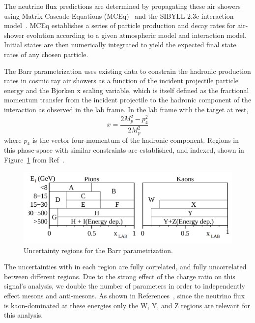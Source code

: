 \documentclass[main.tex]{subfiles}
\begin{document}
The neutrino flux predictions are determined by propagating these air showers using Matrix Cascade Equations (MCEq)~\cite{fedynitch2015calculation} and the SIBYLL 2.3c interaction model~\cite{Riehn:2017mfm}. 
MCEq establishes a series of particle production and decay rates for air-shower evolution according to a given atmospheric model and interaction model. 
Initial states are then numerically integrated to yield the expected final state rates of any chosen particle. 

The Barr parametrization uses existing data to constrain the hadronic production rates in cosmic ray air showers as a function of the incident projectile particle energy and the Bjorken x scaling variable, which is itself defined as the fractional momentum transfer from the incident projectile to the hadronic component of the interaction as observed in the lab frame. 
In the lab frame with the target at rest, 
\begin{equation}
    x = \dfrac{ 2M_{p}^{2} - p_{4}^{2}}{2M_{p}^{2}}
\end{equation}
where $p_{4}$ is the vector four-momentum of the hadronic component. 
Regions in this phase-space with similar constraints are established, and indexed, shown in Figure~\ref{fig:bar_letters} from Ref~\cite{PhysRevD.74.094009}. 
\begin{figure}
    \centering
    \includegraphics[width=0.7\linewidth]{./figures/barr_letters.png}
    \caption{Uncertainty regions for the Barr parametrization.}\label{fig:bar_letters}
\end{figure}
The uncertainties with in each region are fully correlated, and fully uncorrelated between different regions.
Due to the strong effect of the charge ratio on this signal's analysis, we double the number of parameters in order to independently effect mesons and anti-mesons. 
As shown in References~\cite{Aartsen_2020, Aartsen_2020_prd, axani2020sterile}, since the neutrino flux is kaon-dominated at these energies only the W, Y, and Z regions are relevant for this analysis. 
\end{document}
